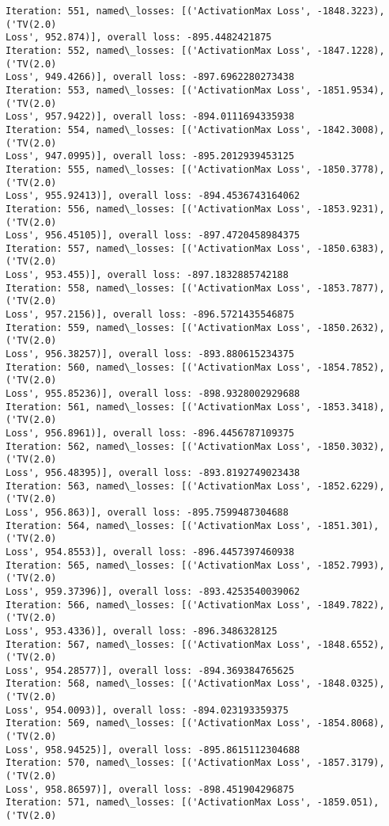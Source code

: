 \documentclass[10pt]{article}
\begin{document}
\begin{Verbatim}[commandchars=\\\{\}]
Iteration: 551, named\_losses: [('ActivationMax Loss', -1848.3223), ('TV(2.0)
Loss', 952.874)], overall loss: -895.4482421875
Iteration: 552, named\_losses: [('ActivationMax Loss', -1847.1228), ('TV(2.0)
Loss', 949.4266)], overall loss: -897.6962280273438
Iteration: 553, named\_losses: [('ActivationMax Loss', -1851.9534), ('TV(2.0)
Loss', 957.9422)], overall loss: -894.0111694335938
Iteration: 554, named\_losses: [('ActivationMax Loss', -1842.3008), ('TV(2.0)
Loss', 947.0995)], overall loss: -895.2012939453125
Iteration: 555, named\_losses: [('ActivationMax Loss', -1850.3778), ('TV(2.0)
Loss', 955.92413)], overall loss: -894.4536743164062
Iteration: 556, named\_losses: [('ActivationMax Loss', -1853.9231), ('TV(2.0)
Loss', 956.45105)], overall loss: -897.4720458984375
Iteration: 557, named\_losses: [('ActivationMax Loss', -1850.6383), ('TV(2.0)
Loss', 953.455)], overall loss: -897.1832885742188
Iteration: 558, named\_losses: [('ActivationMax Loss', -1853.7877), ('TV(2.0)
Loss', 957.2156)], overall loss: -896.5721435546875
Iteration: 559, named\_losses: [('ActivationMax Loss', -1850.2632), ('TV(2.0)
Loss', 956.38257)], overall loss: -893.880615234375
Iteration: 560, named\_losses: [('ActivationMax Loss', -1854.7852), ('TV(2.0)
Loss', 955.85236)], overall loss: -898.9328002929688
Iteration: 561, named\_losses: [('ActivationMax Loss', -1853.3418), ('TV(2.0)
Loss', 956.8961)], overall loss: -896.4456787109375
Iteration: 562, named\_losses: [('ActivationMax Loss', -1850.3032), ('TV(2.0)
Loss', 956.48395)], overall loss: -893.8192749023438
Iteration: 563, named\_losses: [('ActivationMax Loss', -1852.6229), ('TV(2.0)
Loss', 956.863)], overall loss: -895.7599487304688
Iteration: 564, named\_losses: [('ActivationMax Loss', -1851.301), ('TV(2.0)
Loss', 954.8553)], overall loss: -896.4457397460938
Iteration: 565, named\_losses: [('ActivationMax Loss', -1852.7993), ('TV(2.0)
Loss', 959.37396)], overall loss: -893.4253540039062
Iteration: 566, named\_losses: [('ActivationMax Loss', -1849.7822), ('TV(2.0)
Loss', 953.4336)], overall loss: -896.3486328125
Iteration: 567, named\_losses: [('ActivationMax Loss', -1848.6552), ('TV(2.0)
Loss', 954.28577)], overall loss: -894.369384765625
Iteration: 568, named\_losses: [('ActivationMax Loss', -1848.0325), ('TV(2.0)
Loss', 954.0093)], overall loss: -894.023193359375
Iteration: 569, named\_losses: [('ActivationMax Loss', -1854.8068), ('TV(2.0)
Loss', 958.94525)], overall loss: -895.8615112304688
Iteration: 570, named\_losses: [('ActivationMax Loss', -1857.3179), ('TV(2.0)
Loss', 958.86597)], overall loss: -898.451904296875
Iteration: 571, named\_losses: [('ActivationMax Loss', -1859.051), ('TV(2.0)

\end{Verbatim}
\end{document}

